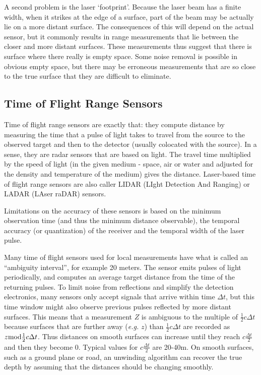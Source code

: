 \documentclass[twocolumn,oneside]{book}
\begin{document}
A second problem is the laser `footprint'.
Because the laser beam has a finite width, when it strikes at the edge
of a surface, part of the beam may be actually lie on a more distant surface.
The consequences of this will depend on the actual sensor, but it commonly
results in range measurements that lie between the closer and more distant
surfaces.
These measurements thus suggest that there is surface where there really is 
empty space.
Some noise removal is possible in obvious empty space, but there may be
erroneous measurements that are so close to the true surface that they
are difficult to eliminate.

\subsection{Time of Flight Range Sensors}

 Time of flight range sensors are exactly that: they compute distance
by measuring the time that a pulse of light takes to travel from the 
source to the observed target and then to the detector (usually colocated
with the source).
In a sense, they are radar sensors that are based on light.
The travel time multiplied by the speed of light (in the given medium - space,
air or water and adjusted for the density and temperature of the medium) gives the
distance.
Laser-based time of flight range sensors are also caller LIDAR
(LIght Detection And Ranging) or LADAR (LAser raDAR) sensors.

Limitations on the accuracy of these sensors is based on the minimum 
observation time (and thus the minimum distance observable),
the temporal accuracy (or quantization) of the receiver and the temporal
width of the laser pulse.

Many time of flight sensors used for local measurements have what is 
called an ``ambiguity interval'', for example 20 meters.
The sensor emits pulses of light periodically, and computes an average
target distance from the time of the returning pulses. 
To limit noise from reflections and simplify the detection electronics,
many sensors only accept signals that arrive within time $\Delta t$,
but this time window might also observe previous pulses reflected by 
more distant surfaces.
This means that a measurement $Z$ is ambiguous to the multiple of
$\frac{1}{2}c\Delta t$ because surfaces that are further away ({\it e.g.} $z$) than 
$\frac{1}{2}c\Delta t$ are recorded as $z {\rm mod} \frac{1}{2}c\Delta t$.
Thus distances on smooth surfaces can increase until they reach
$c\frac{\Delta t}{2}$ and then they become 0.
Typical values for $c\frac{\Delta t}{2}$ are 20-40m.
On smooth surfaces, such as a ground plane or road, an unwinding algorithm
can recover the true depth by assuming that the distances should be changing
smoothly.
\end{document}
